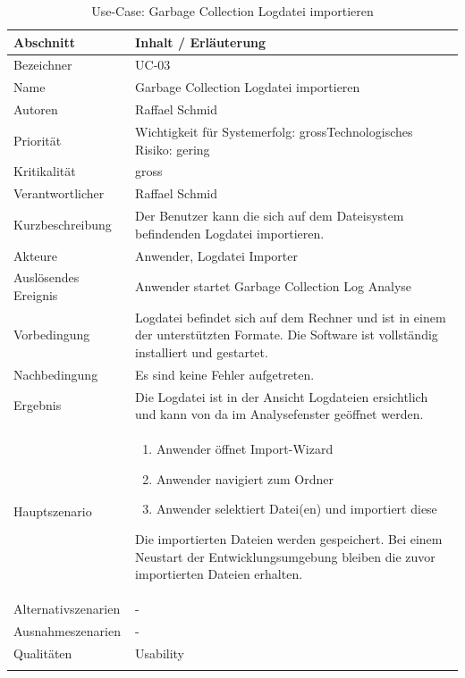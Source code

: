 \begin{longtable}{|p{4cm}|p{10.5cm}|}
\hline
   \textbf{Abschnitt} & \textbf{Inhalt / Erläuterung} \\\hline
   Bezeichner & UC-03\\\hline
   Name & Garbage Collection Logdatei importieren\\\hline
   Autoren & Raffael Schmid\\\hline
   Priorität & Wichtigkeit für Systemerfolg: gross\newline Technologisches Risiko: gering\\\hline
   Kritikalität & gross\\\hline
   Verantwortlicher & Raffael Schmid\\\hline
   Kurzbeschreibung & Der Benutzer kann die sich auf dem Dateisystem befindenden Logdatei importieren.\\\hline
   Akteure & Anwender, Logdatei Importer\\\hline
   Auslösendes Ereignis & Anwender startet Garbage Collection Log Analyse\\\hline
   Vorbedingung & Logdatei befindet sich auf dem Rechner und ist in einem der unterstützten Formate. Die Software ist vollständig installiert und gestartet.\\\hline
   Nachbedingung & Es sind keine Fehler aufgetreten. \\\hline
   Ergebnis & Die Logdatei ist in der Ansicht Logdateien ersichtlich und kann von da im Analysefenster geöffnet werden.\\\hline
   Hauptszenario & 
	\begin{enumerate}
		\item Anwender öffnet Import-Wizard
		\item Anwender navigiert zum Ordner
		\item Anwender selektiert Datei(en) und importiert diese
	\end{enumerate}
Die importierten Dateien werden gespeichert. Bei einem Neustart der Entwicklungsumgebung bleiben die zuvor importierten Dateien erhalten.
	\\\hline
   Alternativszenarien & -\\\hline
   Ausnahmeszenarien & -\\\hline
   Qualitäten & Usability\\\hline
\caption{Use-Case: Garbage Collection Logdatei importieren}
\end{longtable}


